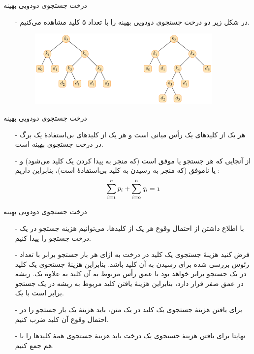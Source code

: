 \begin{frame}{‌درخت جستجوی دودویی بهینه}
\begin{itemize}\itemr
\item[-]
در شکل زیر دو درخت جستجوی دودویی بهینه را با تعداد ۵ کلید مشاهده می‌کنیم.
\begin{figure}
\includegraphics[width=0.9\textwidth]{figs/chap04/optimal-tree}
\end{figure}
\end{itemize}
\end{frame}


\begin{frame}{‌درخت جستجوی دودویی بهینه}
\begin{itemize}\itemr
\item[-]
هر یک از کلیدهای
یک رأس میانی است و هر یک از کلیدهای بی‌استفادهٔ
یک برگ در درخت جستجوی بهینه است.
\item[-]
از آنجایی که هر جستجو یا موفق است (که منجر به پیدا کردن یک کلید
می‌شود) و یا ناموفق (که منجر به رسیدن به کلید بی‌استفادهٔ
است)، بنابراین داریم :
\begin{align*}
\mathnormal{\sum_{i=1}^n p_i + \sum_{i=0}^n q_i = 1}
\end{align*}
\end{itemize}
\end{frame}


\begin{frame}{‌درخت جستجوی دودویی بهینه}
\begin{itemize}\itemr
\item[-]
با اطلاع داشتن از احتمال وقوع هر یک از کلید‌ها، می‌توانیم هزینه جستجو در یک درخت جستجو را پیدا کنیم.
\item[-]
فرض کنید هزینهٔ جستجوی یک کلید در درخت به ازای هر بار جستجو برابر با تعداد رئوس بررسی شده برای رسیدن به آن کلید باشد. بنابراین هزینهٔ جستجوی یک کلید در یک جستجو برابر خواهد بود با عمق
رأس مربوط به آن کلید به علاوهٔ یک. ریشه در عمق صفر قرار دارد، بنابراین هزینهٔ یافتن کلید مربوط به ریشه در یک جستجو برابر است با یک.
\item[-]
برای یافتن هزینهٔ جستجوی یک کلید در یک متن، باید هزینهٔ یک بار جستجو را در احتمال وقوع آن کلید ضرب کنیم.
\item[-]
نهایتا برای یافتن هزینهٔ جستجوی یک درخت باید هزینهٔ جستجوی همهٔ کلیدها را با هم جمع کنیم.
\end{itemize}
\end{frame}

